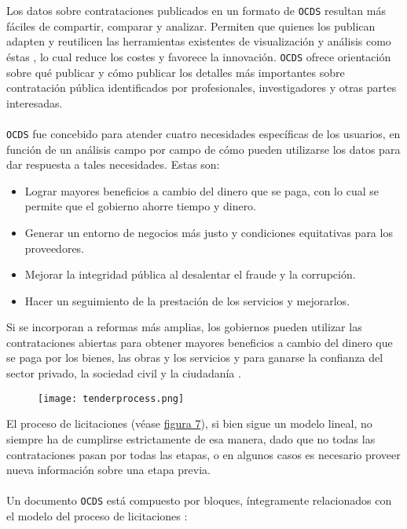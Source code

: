             \noindent Los datos sobre contrataciones publicados en un formato de \texttt{OCDS} resultan más fáciles de compartir, comparar y analizar. Permiten que quienes los publican adapten y reutilicen las herramientas existentes de visualización y análisis como éstas \cite{OCDSTOOLS}, lo cual reduce los costes y favorece la innovación. \texttt{OCDS} ofrece orientación sobre qué publicar y cómo publicar los detalles más importantes sobre contratación pública identificados por profesionales, investigadores y otras partes interesadas.
            \\ \\
            \texttt{OCDS} fue concebido para atender cuatro necesidades específicas de los usuarios, en función de un análisis campo por campo de cómo pueden utilizarse los datos para dar respuesta a tales necesidades. Estas son:
            
            \begin{itemize}
                \item Lograr mayores beneficios a cambio del dinero que se paga, con lo cual se permite que el gobierno ahorre tiempo y dinero.
                \item Generar un entorno de negocios más justo y condiciones equitativas para los proveedores.
                \item Mejorar la integridad pública al desalentar el fraude y la corrupción.
                \item Hacer un seguimiento de la prestación de los servicios y mejorarlos.
            \end{itemize}
            
            Si se incorporan a reformas más amplias, los gobiernos pueden utilizar las contrataciones abiertas para obtener mayores beneficios a cambio del dinero que se paga por los bienes, las obras y los servicios y para ganarse la confianza del sector privado, la sociedad civil y la ciudadanía \cite{OCDSOC}.
            \\
            
            \begin{figure}[h]
                \centering
                \texttt{[image: tenderprocess.png]}
                \label{fig:tenderprocess}
            \end{figure}
            
            \noindent El proceso de licitaciones (véase \hyperref[fig:tenderprocess]{figura 7}), si bien sigue un modelo lineal, no siempre ha de cumplirse estrictamente de esa manera, dado que no todas las contrataciones pasan por todas las etapas, o en algunos casos es necesario proveer nueva información sobre una etapa previa.
            \\ \\
            Un documento \texttt{OCDS} está compuesto por bloques, íntegramente relacionados con el modelo del proceso de licitaciones \cite{OCDSBLOCKS}:
            
